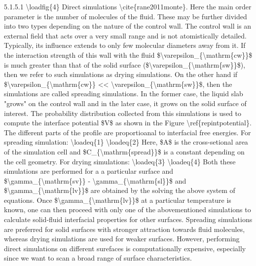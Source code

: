 \par 5.1.5.1 \textbackslash loadfig\{4\} Direct simulations \textbackslash cite\{rane2011monte\}. Here the main order parameter is the number of molecules of the fluid. These may be further divided into two types depending on the nature of the control wall. The control wall is an external field that acts over a very small range and is not atomistically detailed.  Typically, its influence extends to only few molecular diameters away from it. If the interaction strength of this wall with the fluid \$\textbackslash varepsilon\_\{\textbackslash mathrm\{cw\}\}\$ is much greater than that of the solid surface (\$\textbackslash varepsilon\_\{\textbackslash mathrm\{sw\}\}\$), then we refer to such simulations as drying simulations. On the other hand if \$\textbackslash varepsilon\_\{\textbackslash mathrm\{cw\}\} << \textbackslash varepsilon\_\{\textbackslash mathrm\{sw\}\}\$, then the simulations are called spreading simulations. In the former case, the liquid slab "grows" on the control wall and in the later case, it grows on the solid surface of interest. The probability distribution collected from this simulations is used to compute the interface potential \$V\$ as shown in the Figure \textbackslash ref\{repintpotential\}. The different parts of the profile are proportioanal to interfacial free energies. For spreading simulation: \textbackslash loadeq\{1\} \textbackslash loadeq\{2\} Here, \$A\$ is the cross-setional area of the simulation cell and \$C\_\{\textbackslash mathrm\{spread\}\}\$ is a constant depending on the cell geometry.  For drying simulations: \textbackslash loadeq\{3\} \textbackslash loadeq\{4\} Both these simulations are performed for a a particular surface and \$\textbackslash gamma\_\{\textbackslash mathrm\{sv\}\} - \textbackslash gamma\_\{\textbackslash mathrm\{sl\}\}\$ and \$\textbackslash gamma\_\{\textbackslash mathrm\{lv\}\}\$ are obtained by the solving the above system of equations. Once \$\textbackslash gamma\_\{\textbackslash mathrm\{lv\}\}\$ at a particular temperature is known, one can then proceed with only one of the abovementioned simulations to calculate solid-fluid interfacial properties for other surfaces. Spreading simulations are preferred for solid surfaces with stronger attraction towards fluid molecules, whereas drying simulations are used for weaker surfaces. However, performing direct simulations on different surefaces is computationally expensive, especially since we want to scan a broad range of surface characteristics.
